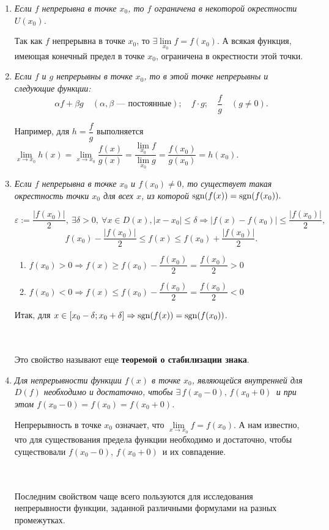 \begin{enumerate}
	\item \textit{Если $f$ непрерывна в точке $x_0$, то $f$ ограничена в некоторой окрестности $U(x_0)$.}
	\begin{Proof}
		Так как $f$ непрерывна в точке $x_0$, то $\exists \lim\limits_{x_0} f = f(x_0)$. А всякая функция, имеющая конечный предел в точке $x_0$, ограничена в окрестности этой точки.
	\end{Proof}
	\item \textit{Если $f$ и $g$ непрерывны в точке $x_0$, то в этой точке непрерывны и следующие функции:}
	$$\alpha f + \beta g \quad(\alpha, \beta \textit{ --- постоянные}); \quad f\cdot g;\quad \dfrac{f}{g} \quad (g \neq 0).$$
	\begin{Proof}
		Например, для $h = \dfrac{f}{g}$ выполняется $\lim\limits_{x \rightarrow x_0} h(x) = \lim\limits_{x \rightarrow x_0} \dfrac{f(x)}{g(x)} = \dfrac{\lim\limits_{x_0} f}{\lim\limits_{x_0} g} = \dfrac{f(x_0)}{g(x_0)} = h(x_0).$
	\end{Proof}
	\item \textit{Если $f$ непрерывна в точке $x_0$ и $f(x_0) \neq 0$, то существует такая окрестность точки $x_0$ для всех $x$, из которой $\operatorname{sgn} (f(x)) = \operatorname{sgn} (f(x_0)).$}
	\begin{Proof}
		$$\varepsilon := \dfrac{\vert f(x_0) \vert}{2},\ \exists \delta > 0,\ \forall x \in D(x), \vert x - x_0 \vert \leqslant \delta \Rightarrow \vert f(x) - f(x_0) \vert \leqslant \dfrac{\vert f(x_0) \vert}{2},$$ $$f(x_0) - \dfrac{\vert f(x_0) \vert}{2} \leqslant f(x) \leqslant f(x_0) + \dfrac{\vert f(x_0) \vert}{2}.$$
		\begin{enumerate}
			\item $f(x_0) > 0 \Rightarrow f(x) \geqslant f(x_0) - \dfrac{f(x_0)}{2} = \dfrac{f(x_0)}{2} > 0$
			\item $f(x_0) < 0 \Rightarrow f(x) \leqslant f(x_0) - \dfrac{f(x_0)}{2} = \dfrac{f(x_0)}{2} < 0$
		\end{enumerate}
		Итак, для $x \in [x_0 - \delta; x_0 + \delta] \Rightarrow \operatorname{sgn}(f(x)) = \operatorname{sgn}(f(x_0))$.
	\end{Proof}\\\\
	Это свойство называют еще \textbf{теоремой о стабилизации знака}.
	\item \textit{Для непрерывности функции $f(x)$ в точке $x_0$, являющейся внутренней для $D(f)$ необходимо и достаточно, чтобы $ \exists \, f(x_0-0), \, f(x_0+0) \,$ и при этом $f(x_0-0)=f(x_0)=f(x_0+0)$.}
	\begin{Proof}
		Непрерывность в точке $x_0$ означает, что $\lim\limits_{x \to x_0} f=f(x_0)$. А нам известно, что для существования предела функции необходимо и достаточно, чтобы существовали $f(x_0-0), \, f(x_0+0) \, $ и их совпадение.
	\end{Proof}\\\\
	Последним свойством чаще всего пользуются для исследования непрерывности функции, заданной различными формулами на разных промежутках.
\end{enumerate}

